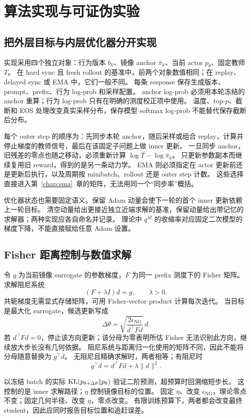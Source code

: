 \chapter{算法实现与可证伪实验}
\label{chap:implementation}

\section{把外层目标与内层优化器分开实现}
实现采用四个独立对象：行为版本 $b_k$、镜像 anchor $\bar\pi_k$、当前 actor $p_\theta$、固定教师 $T$。
在 hard sync 且 fresh rollout 的基准中，前两个对象数值相同；在 replay、delayed sync 或 EMA 中，它们一般不同。
每条 response 保存生成版本、prompt、prefix、行为 log-prob 和采样配置。
anchor log-prob 必须用本轮冻结的 anchor 重算；行为 log-prob 只有在明确的测度校正项中使用。
温度、top-$p$、截断和 EOS 处理改变真实采样分布，保存模型 softmax log-prob 不能替代保存截断后分布。

每个 outer step 的顺序为：先同步本轮 anchor，随后采样或组合 replay，计算并停止梯度的教师信号，最后在该固定子问题上做 inner 更新。
一旦同步 anchor，旧残差的零点也随之移动，必须重新计算 $\log T-\log\bar\pi_k$。
只更新参数副本而继续复用旧 reward，得到的是另一条动力学。
EMA 则必须指定在 actor 更新前还是更新后执行，以及周期按 minibatch、rollout 还是 outer step 计数。
这些选择直接进入第~\ref{chap:ema}~章的矩阵，无法用同一个“同步率”概括。

优化器状态也需要固定语义。保留 Adam 动量会使下一轮的首个 inner 更新依赖上一轮目标。
清空动量给出更接近独立近端求解的基准，保留动量给出带记忆的求解器；两种实现应各自命名并记录。
理论中 $q^M$ 的收缩率对应固定二次模型的梯度下降，不能直接赋给任意 Adam 设置。

\section{Fisher 距离控制与数值求解}
令 $g$ 为当前镜像 surrogate 的参数梯度，$F$ 为同一 prefix 测度下的 Fisher 矩阵。
求解阻尼系统
\[
 (F+\lambda I)d=g,\qquad \lambda>0.
\]
共轭梯度无需显式存储矩阵，可用 Fisher-vector product 计算每次迭代。
当目标是最大化 surrogate，候选更新写成
\[
 \Delta\theta=\sqrt{\frac{2\epsilon_{\mathrm{NG}}}{d^\top Fd}}\,d.
\]
若 $d^\top Fd=0$，停止该方向更新；该分母为零表明所估 Fisher 无法识别此方向，继续放大步长没有几何依据。
阻尼系统与距离归一化使用的矩阵不同，因此不能将分母随意替换为 $g^\top d$。
无阻尼且精确求解时，两者相等；有阻尼时
\[
 g^\top d=d^\top Fd+\lambda\lVert d\rVert^2.
\]

以冻结 batch 的实际 $\operatorname{KL}(p_{\theta+\Delta\theta}\Vert p_\theta)$ 验证二阶预测，超预算时回溯缩短步长。
这控制的是 inner 求解路径；$\eta$ 控制镜像目标的位置。
固定 $\eta$、改变 $\epsilon_{\mathrm{NG}}$，理论零点不变；固定几何半径、改变 $\eta$，零点改变。
有限训练预算下，两者都会改变最终 student，因此应同时报告目标位置和追赶误差。

